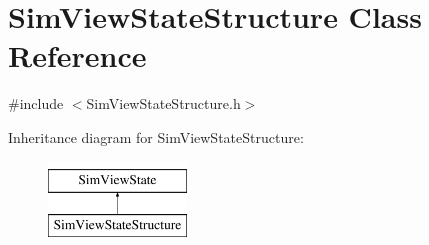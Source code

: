 \hypertarget{class_sim_view_state_structure}{\section{Sim\+View\+State\+Structure Class Reference}
\label{class_sim_view_state_structure}
}


{\ttfamily \#include $<$Sim\+View\+State\+Structure.\+h$>$}

Inheritance diagram for Sim\+View\+State\+Structure\+:\begin{figure}[H]
\begin{center}
\leavevmode
\includegraphics[height=2.000000cm]{class_sim_view_state_structure}
\end{center}
\end{figure}
